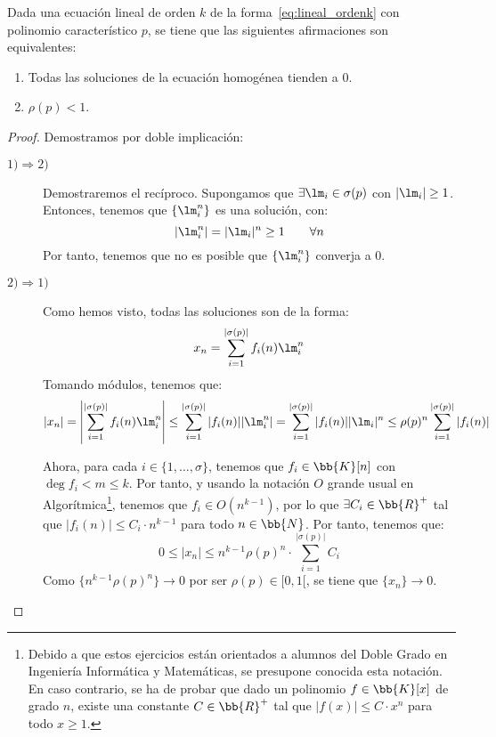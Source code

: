 \begin{prop}\label{prop:converger_0}
    Dada una ecuación lineal de orden $k$ de la forma~\ref{eq:lineal_ordenk} con polinomio característico $p$, se tiene que las siguientes afirmaciones son equivalentes:
    \begin{enumerate}
        \item Todas las soluciones de la ecuación homogénea tienden a 0.
        \item $\rho(p)<1$.
    \end{enumerate}
\end{prop}
\begin{proof} Demostramos por doble implicación:
    \begin{description}
        \item[$1)\Longrightarrow 2)$]
            Demostraremos el recíproco. Supongamos que $\exists \lm_i\in \sigma(p)$ con $|\lm_i|\geq 1$. Entonces, tenemos que $\{\lm_i^n\}$ es una solución, con:
            \begin{equation*}
                |\lm_i^n| = |\lm_i|^n \geq 1 \qquad \forall n
            \end{equation*}
            Por tanto, tenemos que no es posible que $\{\lm_i^n\}$ converja a 0.

        \item[$2)\Longrightarrow 1)$] Como hemos visto, todas las soluciones son de la forma:
        \begin{equation*}
            x_n = \sum_{i = 1}^{|\sigma(p)|} f_i(n) \lm_i^n
        \end{equation*}
        Tomando módulos, tenemos que:
        \begin{equation*}
            |x_n| = \left|\sum_{i = 1}^{|\sigma(p)|} f_i(n) \lm_i^n\right| \leq  \sum_{i = 1}^{|\sigma(p)|} |f_i(n)| |\lm_i^n|
            = \sum_{i = 1}^{|\sigma(p)|} |f_i(n)| |\lm_i|^n
            \leq \rho(p)^n\sum_{i = 1}^{|\sigma(p)|} |f_i(n)|
        \end{equation*}

        Ahora, para cada $i\in \{1,\dots,\sigma\}$, tenemos que $f_i\in \bb{K}[n]$ con $\deg f_i<m\leq k$. Por tanto, y usando la notación $O$ grande usual en Algorítmica\footnote{Debido a que estos ejercicios están orientados a alumnos del Doble Grado en Ingeniería Informática y Matemáticas, se presupone conocida esta notación. En caso contrario, se ha de probar que dado un polinomio $f\in \bb{K}[x]$ de grado $n$, existe una constante $C\in \bb{R}^+$ tal que $|f(x)|\leq C\cdot x^n$ para todo $x\geq 1$.}, tenemos que $f_i\in O(n^{k-1})$, por lo que $\exists C_i\in \bb{R}^+$ tal que $|f_i(n)|\leq C_i\cdot n^{k-1}$ para todo $n\in \bb{N}$.
        Por tanto, tenemos que:
        \begin{equation*}
            0\leq |x_n|\leq n^{k-1}\rho(p)^n\cdot \sum_{i = 1}^{|\sigma(p)|} C_i
        \end{equation*}
        Como $\{n^{k-1}\rho(p)^n\}\to 0$ por ser $\rho(p)\in [0,1[$, se tiene que $\{x_n\}\to 0$.
    \end{description}
\end{proof}

